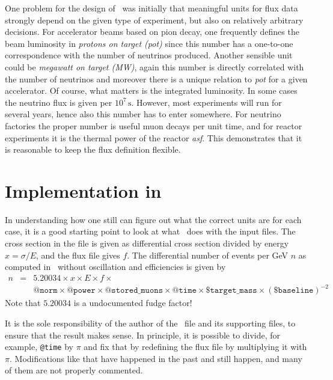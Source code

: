\begin{appendix}
One problem for the design of \AEDL\ was initially that meaningful
units for flux data strongly depend on the given type of experiment,
but also on relatively arbitrary decisions. For accelerator beams
based on pion decay, one frequently defines the beam luminosity in
{\it protons on target (pot)} since this number has a one-to-one
correspondence with the number of neutrinos produced. Another sensible
unit could be {\it megawatt on target (MW)}, again this number is directly
correlated with the number of neutrinos and moreover there is a unique
relation to {\it pot} for a given accelerator. Of course,
what matters is the integrated luminosity. In some  cases the
neutrino flux is given per $10^7\,\mathrm{s}$. However,
most experiments will run for several years, hence also this number
has to enter somewhere. For neutrino factories the proper number is
useful muon decays per unit time, and for reactor experiments it is
the thermal power of the reactor {\it asf}. This demonstrates that it is
reasonable to keep the flux definition flexible.

\section*{Implementation in \GLOBES }

In understanding how one still can figure out what the correct units
are for each case, it is a good starting point to look at what
\GLOBES\ does with the input files. The cross section in the file is given as
differential cross section divided by energy $x=\sigma/E$, and the flux file
gives $f$. The differential number of events per GeV $n$ as computed in
\GLOBES\ without oscillation and efficiencies is given by
\begin{eqnarray}
n &=& 5.20034\times x\times E\times f\times \nonumber \\
&&\mathtt{@norm}\times\mathtt{@power}\times\mathtt{@stored\_muons}\times\mathtt{@time}\times\mathtt{\$target\_mass}\times(\mathtt{\$baseline})^{-2} \nonumber
\end{eqnarray}
Note that $5.20034$ is a undocumented fudge factor!

It is the sole responsibility of the author of the \AEDL\ file and its
supporting files, to ensure that the result makes sense. In
principle, it is possible to divide, for example, {\tt @time}  by
$\pi$ and fix that by redefining the flux file by multiplying
it with $\pi$. Modifications like that have happened in the past
and still happen, and many of them are not properly commented.
 

\end{appendix}
